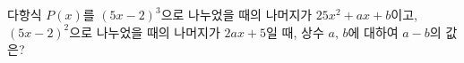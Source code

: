 다항식 $P(x)$를 $(5x-2)^3$으로 나누었을 때의 나머지가 $25x^2+ax+b$이고, $(5x-2)^2$으로 나누었을 때의 나머지가 $2ax+5$일 때, 상수 $a$, $b$에 대하여 $a-b$의 값은?
